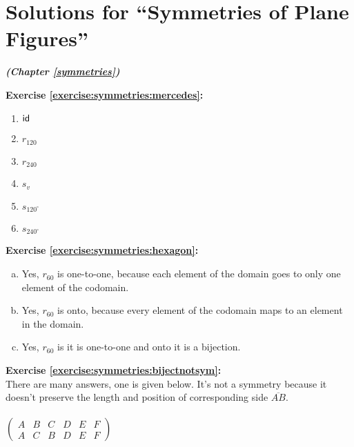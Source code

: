 \section{Solutions for  ``Symmetries of Plane Figures''}
\noindent\textbf{\textit{ (Chapter \ref{symmetries})}}\bigskip

\noindent\textbf{Exercise \ref{exercise:symmetries:mercedes}:}
\begin{multicols}{3}
\begin{enumerate}
\item
$\sf{id}$

\item
$r_{120}$

\item
$r_{240}$

\item
$s_v$

\item
$s_{120^{\circ}}$

\item
$s_{240^{\circ}}$
\end{enumerate}
\end{multicols}

\noindent\textbf{Exercise \ref{exercise:symmetries:hexagon}:}
\begin{enumerate}[(a)]
\item
Yes, $r_{60}$ is one-to-one, because each element of the domain goes to only one element of the codomain.

\item
Yes, $r_{60}$ is onto, because every element of the codomain maps to an element in the domain.

\item
Yes, $r_{60}$ is it is one-to-one and onto it is a bijection.
\end{enumerate}

\noindent\textbf{Exercise \ref{exercise:symmetries:bijectnotsym}:}\\
There are many answers, one is given below.  It's not a symmetry because it doesn't preserve the length and position of corresponding side $\overline{AB}$.\\
\\
$\begin{pmatrix}
A & B & C & D & E & F\\
A & C & B & D & E & F
\end{pmatrix}$\\

